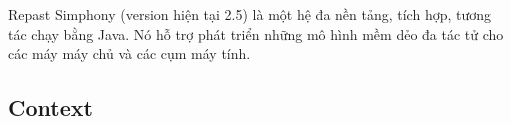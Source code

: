 \documentclass[../report.tex]{subfiles}
\begin{document}
Repast Simphony (version hiện tại 2.5) là một hệ đa nền tảng, tích hợp, tương tác chạy bằng Java. Nó hỗ trợ 
phát triển những mô hình mềm dẻo đa tác tử cho các máy máy chủ và các cụm máy tính. \cite{repast-simphony}

\subsection{Context}
\end{document}
